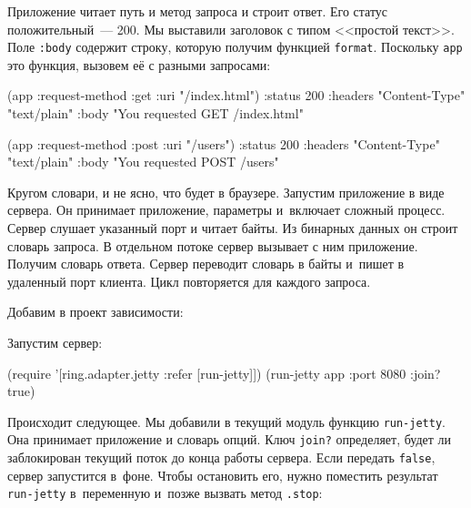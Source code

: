 Приложение читает путь и метод запроса и строит ответ. Его статус
положительный~--- 200. Мы выставили заголовок с типом <<простой текст>>. Поле
\verb|:body| содержит строку, которую получим функцией
\verb|format|. Поскольку \verb|app| это функция, вызовем её с разными
запросами:

\begin{english}
  \begin{clojure}
(app {:request-method :get :uri "/index.html"})
{:status 200
 :headers {"Content-Type" "text/plain"}
 :body "You requested GET /index.html"}

(app {:request-method :post :uri "/users"})
{:status 200
 :headers {"Content-Type" "text/plain"}
 :body "You requested POST /users"}
  \end{clojure}
\end{english}

Кругом словари, и не ясно, что будет в браузере. Запустим приложение в виде
сервера. Он принимает приложение, параметры и~включает сложный процесс. Сервер
слушает указанный порт и читает байты. Из бинарных данных он строит словарь
запроса. В отдельном потоке сервер вызывает с ним приложение. Получим словарь
ответа. Сервер переводит словарь в байты и~пишет в удаленный порт клиента. Цикл
повторяется для каждого запроса.


Добавим в проект зависимости:

\begin{english}
  \begin{clojure}
  \end{clojure}
\end{english}

\noindent
Запустим сервер:

\begin{english}
  \begin{clojure}
(require '[ring.adapter.jetty :refer [run-jetty]])
(run-jetty app {:port 8080 :join? true})
  \end{clojure}
\end{english}

Происходит следующее. Мы добавили в текущий модуль функцию
\verb|run-jetty|. Она принимает приложение и словарь опций. Ключ
\verb|join?| определяет, будет ли заблокирован текущий поток до конца работы
сервера. Если передать \verb|false|, сервер запустится в~фоне. Чтобы
остановить его, нужно поместить результат \verb|run-jetty| в~переменную
и~позже вызвать метод \verb|.stop|:

